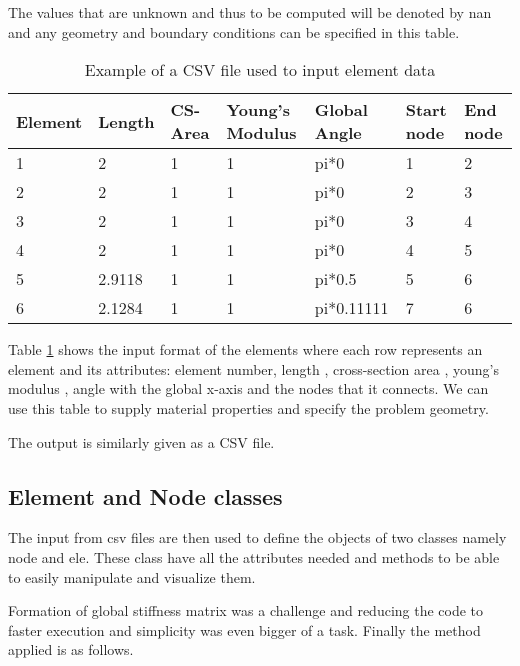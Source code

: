 The values that are unknown and thus to be computed will be denoted by nan and any geometry and boundary conditions can be specified in this table.

\begin{table}[h!]
	\centering
	\begin{tabular}{|l|l|l|l|l|l|l|}
		\hline
		Element & Length & CS-Area & Young's Modulus & Global Angle & Start node & End node \\
		\hline
		1               & 2      & 1                    & 1              & pi*0         & 1             & 2           \\
		2               & 2      & 1                    & 1              & pi*0         & 2             & 3           \\
		3               & 2      & 1                    & 1              & pi*0         & 3             & 4           \\
		4               & 2      & 1                    & 1              & pi*0         & 4             & 5           \\
		5               & 2.9118 & 1                    & 1              & pi*0.5       & 5             & 6           \\
		6               & 2.1284 & 1                    & 1              & pi*0.11111   & 7             & 6           \\
     	\hline
	\end{tabular}
	\caption{Example of a CSV file used to input element data}
	\label{element_csv_table}
\end{table}


Table \ref{element_csv_table} shows the input format of the elements where each row represents an element and its attributes: element number, length , cross-section area , young's modulus , angle with the global x-axis and the nodes that it connects. We can use this table to supply material properties and specify the problem geometry.

The output is similarly given as a CSV file.

\subsection{Element and Node classes}
The input from csv files are then used to define the objects of two classes namely node and ele. These class have all the attributes needed and methods to be able to easily manipulate and visualize them.

Formation of global stiffness matrix was a challenge and reducing the code to faster execution and simplicity was even bigger of a task. Finally the method applied is as follows.


